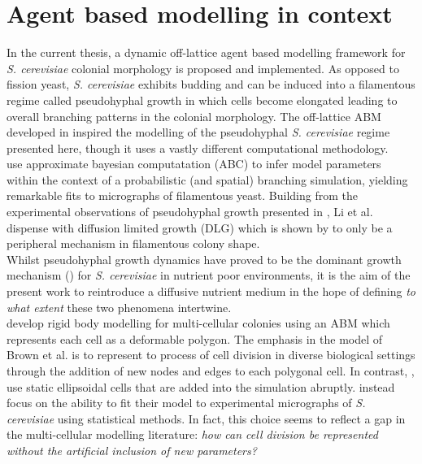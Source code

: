  \section{Agent based modelling in context}

 In the current thesis, a dynamic off-lattice agent based modelling framework for \textit{S. cerevisiae} 
 colonial morphology 
 is proposed and implemented. As opposed to fission yeast, \textit{S. cerevisiae} exhibits 
 budding and can be induced into a filamentous regime called pseudohyphal growth
 in which cells become elongated leading to overall branching patterns 
 in the colonial morphology. The off-lattice ABM developed in \cite{li2024off} 
 inspired the modelling of the pseudohyphal \textit{S. cerevisiae} regime 
 presented here, though it uses a vastly different computational methodology.
 \\

 \cite{li2024off} use approximate bayesian computatation (ABC)
 to infer model parameters within the context of a probabilistic (and spatial) branching simulation, 
 yielding remarkable fits to micrographs of filamentous yeast. Building 
 from the experimental observations of pseudohyphal growth presented in 
 \cite{gimeno1992unipolar}, Li et al. dispense with diffusion limited growth (DLG) which is
shown by \cite{tronnolone2018diffusion} to only be a peripheral mechanism in filamentous 
colony shape.
\\

Whilst pseudohyphal growth dynamics
have proved to be the dominant growth mechanism (\cite{tronnolone2018diffusion}) for 
\textit{S. cerevisiae} in nutrient poor environments, it is the aim of the present 
work to reintroduce a diffusive nutrient medium in the hope of defining 
\textit{to what extent} these two phenomena intertwine.
\\

\cite{brown2021rigid} develop rigid body modelling for multi-cellular colonies using 
an ABM which represents each cell as a deformable polygon. The emphasis in the model 
of Brown et al. is to represent to process of cell division in diverse biological 
settings through the addition of new nodes and edges to each polygonal cell. 
In contrast, \cite{li2024off}, use static ellipsoidal cells that are added into the simulation
abruptly. \cite{li2024off} instead focus on the ability to fit their model 
to experimental micrographs of \textit{S. cerevisiae} using statistical methods.
In fact, this choice seems to reflect a gap in the multi-cellular modelling literature:
\textit{how can cell division be represented without the artificial inclusion of new parameters?}
\\

